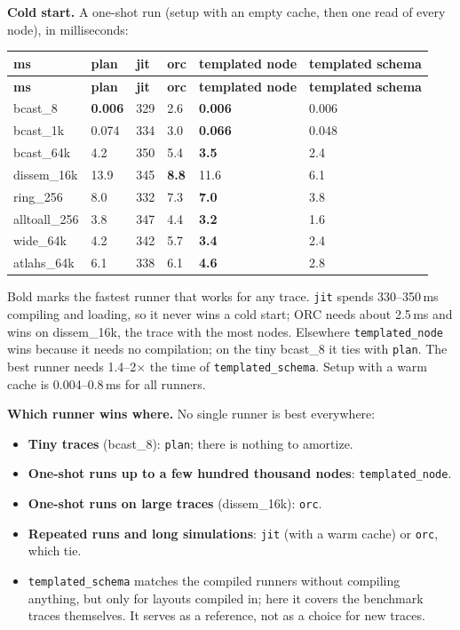\documentclass[10pt,a4paper]{article}
\begin{document}
\textbf{Cold start.} A one-shot run (setup with an empty cache, then one read of every node), in milliseconds:

{\small
\begin{longtable}{P{0.17\dimexpr{}\tabcolsep\relax}P{0.11\dimexpr{}\tabcolsep\relax}P{0.11\dimexpr{}\tabcolsep\relax}P{0.11\dimexpr{}\tabcolsep\relax}P{0.2\dimexpr{}\tabcolsep\relax}P{0.2\dimexpr{}\tabcolsep\relax}}
\toprule
\textbf{ms} & \textbf{plan} & \textbf{jit} & \textbf{orc} & \textbf{templated node} & \textbf{templated schema} \\
\midrule
\endfirsthead
\toprule
\textbf{ms} & \textbf{plan} & \textbf{jit} & \textbf{orc} & \textbf{templated node} & \textbf{templated schema} \\
\midrule
\endhead
\bottomrule
\endfoot
bcast\_8 & \textbf{0.006} & 329 & 2.6 & \textbf{0.006} & 0.006 \\
bcast\_1k & 0.074 & 334 & 3.0 & \textbf{0.066} & 0.048 \\
bcast\_64k & 4.2 & 350 & 5.4 & \textbf{3.5} & 2.4 \\
dissem\_16k & 13.9 & 345 & \textbf{8.8} & 11.6 & 6.1 \\
ring\_256 & 8.0 & 332 & 7.3 & \textbf{7.0} & 3.8 \\
alltoall\_256 & 3.8 & 347 & 4.4 & \textbf{3.2} & 1.6 \\
wide\_64k & 4.2 & 342 & 5.7 & \textbf{3.4} & 2.4 \\
atlahs\_64k & 6.1 & 338 & 6.1 & \textbf{4.6} & 2.8 \\
\end{longtable}
}

Bold marks the fastest runner that works for any trace. \texttt{jit} spends 330--350\,ms compiling and loading, so it never wins a cold start; ORC needs about 2.5\,ms and wins on dissem\_16k, the trace with the most nodes. Elsewhere \texttt{templated\_node} wins because it needs no compilation; on the tiny bcast\_8 it ties with \texttt{plan}. The best runner needs 1.4--2\(\times\) the time of \texttt{templated\_schema}. Setup with a warm cache is 0.004--0.8\,ms for all runners.

\textbf{Which runner wins where.} No single runner is best everywhere:

\begin{itemize}
\item \textbf{Tiny traces} (bcast\_8): \texttt{plan}; there is nothing to amortize.
\item \textbf{One-shot runs up to a few hundred thousand nodes}: \texttt{templated\_node}.
\item \textbf{One-shot runs on large traces} (dissem\_16k): \texttt{orc}.
\item \textbf{Repeated runs and long simulations}: \texttt{jit} (with a warm cache) or \texttt{orc}, which tie.
\item \texttt{templated\_schema} matches the compiled runners without compiling anything, but only for layouts compiled in; here it covers the benchmark traces themselves. It serves as a reference, not as a choice for new traces.
\end{itemize}
\end{document}
